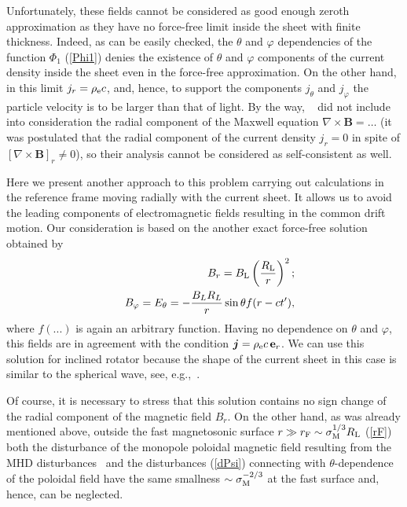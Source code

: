 \documentclass[useAMS,usenatbib]{mn2e}
\def\vph{\varphi}
\def\th{\theta}
\def\b{B_{L \rm} R_{L \rm}}
\begin{document}
Unfortunately, these fields cannot be considered as good enough zeroth approximation as
they have no force-free limit inside the sheet with finite thickness. Indeed, as can
be easily checked, the $\theta$ and $\varphi$ dependencies of the function $\Phi_{1}$
(\ref{Phi1}) denies the existence of $\theta$ and $\varphi$ components of the current
density inside the sheet even in the force-free approximation. On the other hand, in
this limit $j_r = \rho_{\rm e}c$, and, hence, to support the components $j_{\theta}$
and $j_{\varphi}$ the particle velocity is to be larger than that of light. By the way,
~\citet{2001ApJ...547..437L} did not include into consideration the radial component of 
the Maxwell equation $\nabla \times {\boldsymbol B} = \dots$  (it was postulated that the radial
component of the current density $j_{r} = 0$ in spite of $[\nabla \times {\boldsymbol B}]_{r} \neq 0$),
so their analysis cannot be considered as self-consistent as well.

Here we present another approach to this problem { carrying out calculations 
in the reference frame moving radially with the current sheet}. It allows us to avoid the
leading components of electromagnetic fields resulting in the common drift motion.
Our consideration is based on the another exact force-free solution obtained 
by~\citet{2011PhRvD..83l4035L}
\begin{eqnarray}
&&B_r= B_{\rm L} \left(\frac{R_{\rm L}}{r} \right)^2;
\label{eqn2_1}\\
&&B_\vph= E_\th =-\frac{\b}{r} \sin \th f(r- c t'),
\label{eqn2_2}
\end{eqnarray}
where $f(...)$ is again an arbitrary function. Having no dependence on $\theta$ and $\varphi$,
this fields are in agreement with the condition ${\boldsymbol j} = \rho_{\rm e}c \, {\bf e}_{r}$. We can
use this solution for inclined rotator because the shape of the current sheet in this case is
similar to the spherical wave, see, e.g.,~\citet{2012MNRAS.420.2793K}.

Of course, it is necessary to stress that this solution contains no sign change of the radial
component of the magnetic field $B_r$. On the other hand, as was already mentioned above, 
outside the fast magnetosonic surface $r \gg r_{\rm F} \sim \sigma_{\rm M}^{1/3} R_{\rm L}$ 
(\ref{rF}) both the disturbance of the monopole poloidal magnetic field resulting from the 
MHD disturbances~\citep{bes98} and the disturbances (\ref{dPsi}) connecting with 
$\theta$-dependence of the poloidal field have the same smallness $\sim \sigma_{\rm M}^{-2/3}$ 
at the fast surface and, hence, can be neglected.
\end{document}
